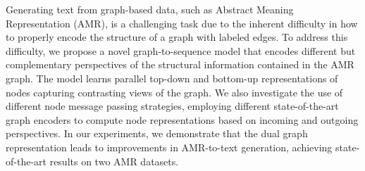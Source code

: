 Generating text from graph-based data, such as Abstract Meaning Representation (AMR), is a challenging task due to the inherent difficulty in how to properly encode the structure of a graph with labeled edges. To address this difficulty, we propose a novel graph-to-sequence model that encodes different but complementary perspectives of the structural information contained in the AMR graph. The model learns parallel top-down and bottom-up representations of nodes capturing contrasting views of the graph. We also investigate the use of different node message passing strategies, employing different state-of-the-art graph encoders to compute node representations based on incoming and outgoing perspectives. In our experiments, we demonstrate that the dual graph representation leads to improvements in AMR-to-text generation, achieving state-of-the-art results on two AMR datasets.

